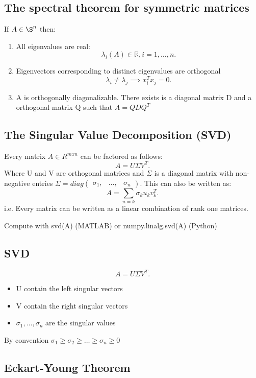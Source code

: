 \documentclass[a4paper]{article}
\newcommand{\R}{\mathbb{R}}
\newcommand{\0}{\mathbb{\emptyset}}
\begin{document}
	\subsection{The spectral theorem for symmetric matrices}
	If $A \in \S^n$ then:
	\begin{enumerate}
		\item All eigenvalues are real:
			\[
				\lambda_i(A) \in \R, i=1, \ldots, n
			.\] 
		\item Eigenvectors corresponding to distinct eigenvalues are
			orthogonal
			\[
			\lambda_i \neq  \lambda_j \implies x_i^Tx_j = 0
			.\] 
		\item A is orthogonally diagonalizable. There exists is a
			diagonal matrix D and a orthogonal matrix Q such that
			$A=QDQ^T$
	\end{enumerate}
	\subsection{The Singular Value Decomposition (SVD)}
	Every matrix $A \in R^{mxn}$ can be factored as follows:
	\[
	A = U\Sigma V^T
	.\] 
	Where U and V are orthogonal matrices and $\Sigma$ is a diagonal matrix
	with non-negative entries $\Sigma=diag\begin{pmatrix} \sigma_1, &
	\ldots, & \sigma_n \end{pmatrix} $. This can also be written as:
	\[
	A= \sum_{n=k} \sigma_ku_kv_k^T
	.\] 
	i.e. Every matrix can be written as a linear combination of rank one
	matrices. \par
	Compute with svd(A) (MATLAB) or numpy.linalg.svd(A) (Python)
	\subsection{SVD}
	\[
	A=U\Sigma V^T
	.\] 
	\begin{itemize}
		\item U contain the left singular vectors
		\item V contain the right singular vectors
		\item $\sigma_1, \ldots, \sigma_n$ are the singular values
	\end{itemize}
	By convention $\sigma_1 \ge \sigma_2 \ge \ldots \ge \sigma_n \ge 0$ \par
	\subsection{Eckart-Young Theorem}
\end{document}
